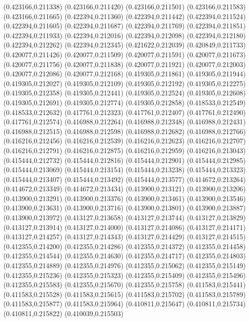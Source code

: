 (0.423166,0.211338)
(0.423166,0.211420)
(0.423166,0.211501)
(0.423166,0.211583)
(0.423166,0.211665)
(0.422394,0.211360)
(0.422394,0.211442)
(0.422394,0.211524)
(0.422394,0.211605)
(0.422394,0.211687)
(0.422394,0.211769)
(0.422394,0.211851)
(0.422394,0.211933)
(0.422394,0.212016)
(0.422394,0.212098)
(0.422394,0.212180)
(0.422394,0.212262)
(0.422394,0.212345)
(0.421622,0.212039)
(0.420849,0.211733)
(0.420077,0.211426)
(0.420077,0.211509)
(0.420077,0.211591)
(0.420077,0.211673)
(0.420077,0.211756)
(0.420077,0.211838)
(0.420077,0.211921)
(0.420077,0.212003)
(0.420077,0.212086)
(0.420077,0.212168)
(0.419305,0.211861)
(0.419305,0.211944)
(0.419305,0.212027)
(0.419305,0.212109)
(0.419305,0.212192)
(0.419305,0.212275)
(0.419305,0.212358)
(0.419305,0.212441)
(0.419305,0.212524)
(0.419305,0.212608)
(0.419305,0.212691)
(0.419305,0.212774)
(0.419305,0.212858)
(0.418533,0.212549)
(0.418533,0.212632)
(0.417761,0.212323)
(0.417761,0.212407)
(0.417761,0.212490)
(0.417761,0.212574)
(0.416988,0.212264)
(0.416988,0.212348)
(0.416988,0.212431)
(0.416988,0.212515)
(0.416988,0.212598)
(0.416988,0.212682)
(0.416988,0.212766)
(0.416216,0.212456)
(0.416216,0.212539)
(0.416216,0.212623)
(0.416216,0.212707)
(0.416216,0.212791)
(0.416216,0.212875)
(0.416216,0.212959)
(0.416216,0.213043)
(0.415444,0.212732)
(0.415444,0.212816)
(0.415444,0.212901)
(0.415444,0.212985)
(0.415444,0.213069)
(0.415444,0.213154)
(0.415444,0.213238)
(0.415444,0.213323)
(0.415444,0.213407)
(0.415444,0.213492)
(0.415444,0.213577)
(0.414672,0.213264)
(0.414672,0.213349)
(0.414672,0.213434)
(0.413900,0.213121)
(0.413900,0.213206)
(0.413900,0.213291)
(0.413900,0.213376)
(0.413900,0.213461)
(0.413900,0.213546)
(0.413900,0.213631)
(0.413900,0.213716)
(0.413900,0.213801)
(0.413900,0.213887)
(0.413900,0.213972)
(0.413127,0.213658)
(0.413127,0.213744)
(0.413127,0.213829)
(0.413127,0.213914)
(0.413127,0.214000)
(0.413127,0.214086)
(0.413127,0.214171)
(0.413127,0.214257)
(0.413127,0.214343)
(0.413127,0.214429)
(0.413127,0.214515)
(0.412355,0.214200)
(0.412355,0.214286)
(0.412355,0.214372)
(0.412355,0.214458)
(0.412355,0.214544)
(0.412355,0.214630)
(0.412355,0.214717)
(0.412355,0.214803)
(0.412355,0.214889)
(0.412355,0.214976)
(0.412355,0.215062)
(0.412355,0.215149)
(0.412355,0.215236)
(0.412355,0.215323)
(0.412355,0.215409)
(0.412355,0.215496)
(0.412355,0.215583)
(0.412355,0.215670)
(0.412355,0.215758)
(0.411583,0.215441)
(0.411583,0.215528)
(0.411583,0.215615)
(0.411583,0.215702)
(0.411583,0.215789)
(0.411583,0.215877)
(0.411583,0.215964)
(0.410811,0.215647)
(0.410811,0.215734)
(0.410811,0.215822)
(0.410039,0.215503)
